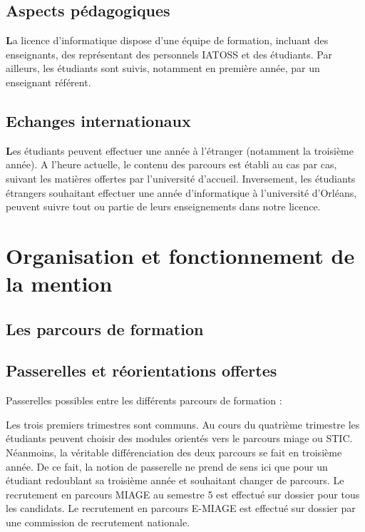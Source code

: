 \documentclass[10pt, a5paper]{report}
\begin{document}
\begin{spacing}{1.5}
{







\section*{Aspects pédagogiques}
\textcolor{couleurFonce}{\textbf{\Large{L}}}a licence d’informatique dispose d’une équipe de formation, incluant des enseignants, des représentant des personnels IATOSS et des étudiants. Par ailleurs, les étudiants sont suivis, notamment en première année, par un enseignant référent.

\section*{Echanges internationaux}
\textcolor{couleurFonce}{\textbf{\Large{L}}}es étudiants peuvent effectuer une année à l’étranger (notamment la troisième année). A l’heure actuelle, le contenu des parcours est établi au cas par cas, suivant les matières offertes par l’université d’accueil. Inversement, les étudiants étrangers souhaitant effectuer une année d’informatique à l’université d’Orléans, peuvent suivre tout ou partie de leurs enseignements dans notre licence. 
}

\chapter*{Organisation et fonctionnement de la mention}
\section*{Les parcours de formation}
\section*{Passerelles et réorientations offertes}
Passerelles possibles entre les différents parcours de formation :

Les trois premiers trimestres sont communs. Au cours du quatrième trimestre les étudiants peuvent choisir des modules orientés vers le parcours miage ou STIC. Néanmoins, la véritable différenciation des deux parcours se fait en troisième année. De ce fait, la notion de passerelle ne prend de sens ici que pour un étudiant redoublant sa troisième année et souhaitant changer de parcours.
Le recrutement en parcours MIAGE au semestre 5 est effectué sur dossier pour tous les candidats. 
Le recrutement en parcours E-MIAGE est effectué sur dossier par une commission de recrutement nationale. 


\end{spacing}
\end{document}
